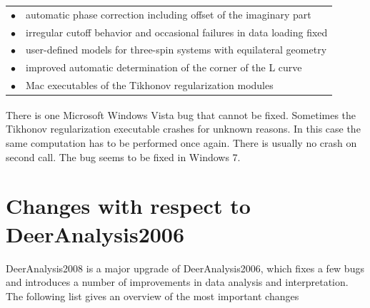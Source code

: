 \documentclass{article}
\begin{document}
\begin{tabular}{ll}
\noalign{\smallskip}
$\bullet$ & automatic phase correction including offset of the imaginary part\\
$\bullet$ & irregular cutoff behavior and occasional failures in data loading fixed\\
$\bullet$ & user-defined models for three-spin systems with equilateral geometry\\
$\bullet$ & improved automatic determination of the corner of the L curve\\
$\bullet$ & Mac executables of the Tikhonov regularization modules\\ 
\end{tabular}

\vspace{10pt}

There is one Microsoft Windows Vista\textsuperscript{\textregistered} bug that cannot be fixed. Sometimes the Tikhonov regularization executable crashes for unknown reasons. In this case the same computation has to be performed once again. There is usually no crash on second call. The bug seems to be fixed in Windows 7.

\section{Changes with respect to DeerAnalysis2006}
\label{changes_2006_1}

DeerAnalysis2008 is a major upgrade of DeerAnalysis2006, which fixes a few bugs and introduces a number of improvements in data analysis and interpretation. The following list gives an overview of the most important changes    
\end{document}
